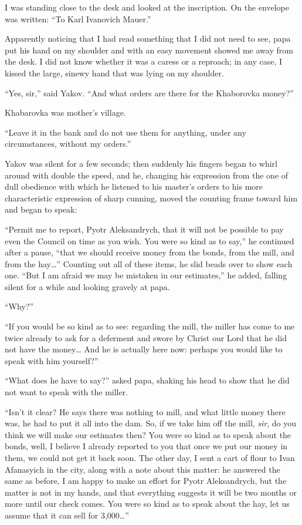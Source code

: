 I was standing close to the desk and looked at the inscription. On the envelope was written: ``To Karl Ivanovich Mauer.''

Apparently noticing that I had read something that I did not need to see, papa put his hand on my shoulder and with an easy movement showed me away from the desk. I did not know whether it was a caress or a reproach; in any case, I kissed the large, sinewy hand that was lying on my shoulder.

``Yes, sir,'' said Yakov. ``And what orders are there for the Khaborovka money?'' %

Khabarovka was mother's village.

``Leave it in the bank and do not use them for anything, under any circumstances, without my orders.'' %

Yakov was silent for a few seconds; then suddenly his fingers began to whirl around with double the speed, and he, changing his expression from the one of dull obedience with which he listened to his master's orders to his more characteristic expression of sharp cunning, moved the counting frame toward him and began to speak:

``Permit me to report, Pyotr Aleksandrych, that it will not be possible to pay even the Council on time as you wish. You were so kind as to say,'' he continued after a pause, ``that we should receive money from the bonds, from the mill, and from the hay\ldots{}'' Counting out all of these items, he slid beads over to show each one. ``But I am afraid we may be mistaken in our estimates,'' he added, falling silent for a while and looking gravely at papa. %

``Why?'' %

``If you would be so kind as to see: regarding the mill, the miller has come to me twice already to ask for a deferment and swore by Christ our Lord that he did not have the money\ldots{} And he is actually here now: perhaps you would like to speak with him yourself?'' %

``What does he have to say?'' asked papa, shaking his head to show that he did not want to speak with the miller. %

``Isn't it clear? He says there was nothing to mill, and what little money there was, he had to put it all into the dam. So, if we take him off the mill, \emph{sir}, do you think we will make our estimates then? You were so kind as to speak about the bonds, well, I believe I already reported to you that once we put our money in them, we could not get it back soon. The other day, I sent a cart of flour to Ivan Afanasyich in the city, along with a note about this matter: he answered the same as before, I am happy to make an effort for Pyotr Aleksandrych, but the matter is not in my hands, and that everything suggests it will be two months or more until our check comes. You were so kind as to speak about the hay, let us assume that it can sell for 3,000\ldots{}'' %

